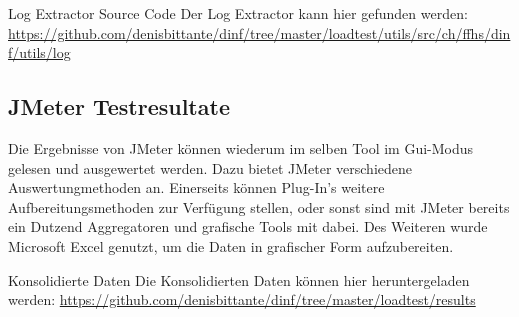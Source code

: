 \documentclass[main.tex]{subfiles}
\begin{document}
\begin{reference}{Log Extractor Source Code}
Der Log Extractor kann hier gefunden werden:  \url{https://github.com/denisbittante/dinf/tree/master/loadtest/utils/src/ch/ffhs/dinf/utils/log}
 
\end{reference}



\subsection{JMeter Testresultate}


Die Ergebnisse von JMeter können wiederum im selben Tool im Gui-Modus gelesen und ausgewertet werden. Dazu bietet JMeter verschiedene Auswertungmethoden an. Einerseits können Plug-In’s weitere Aufbereitungsmethoden zur Verfügung stellen, oder sonst sind mit JMeter bereits ein Dutzend Aggregatoren und grafische Tools mit dabei. Des Weiteren wurde Microsoft Excel genutzt, um die Daten in grafischer Form aufzubereiten.

\begin{reference}{Konsolidierte Daten}
Die Konsolidierten Daten können hier heruntergeladen werden:  \url{https://github.com/denisbittante/dinf/tree/master/loadtest/results}
 
\end{reference}
\end{document}
